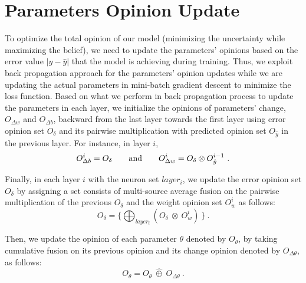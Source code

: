 {\color{red}
\section{Parameters Opinion Update}
\label{opt_app}
To optimize the total opinion of our model (minimizing the uncertainty while maximizing the belief), we need to update the parameters' opinions based on the error value $|y-\hat{y}|$ that the model is achieving during training. Thus, we exploit back propagation approach for the parameters' opinion updates while we are updating the actual parameters in mini-batch gradient descent to minimize the loss function. Based on what we perform in back propagation process to update the parameters in each layer, we initialize the opinions of parameters' change, $O_{\Delta w}$ and $O_{\Delta b}$, backward from the last layer towards the first layer using error opinion set $O_{\delta}$ and its pairwise multiplication with predicted opinion set $O_{\hat{y}}$ in the previous layer. For instance, in layer $i$,
\begin{equation}
    O_{\Delta b}^i = O_{\delta} \qquad \textnormal{and} \qquad O_{\Delta w}^i = O_{\delta} \otimes O_{\hat{y}}^{i-1}\ .
\end{equation}

Finally, in each layer $i$ with the neuron set $layer_i$, we update the error opinion set $O_{\delta}$ by assigning a set consists of multi-source average fusion on the pairwise multiplication of the previous $O_{\delta}$ and the weight opinion set $O_{w}^i$ as follows:
\begin{equation}
    O_{\delta} = \{ \bigoplus_{layer_i}(O_{\delta}\ \otimes\ O_{w}^i)\ \}\ .
\end{equation}

Then, we update the opinion of each parameter $\theta$ denoted by $O_{\theta}$, by taking cumulative fusion on its previous opinion and its change opinion denoted by $O_{\Delta \theta}$, as follows:
\begin{equation}
    O_{\theta} = O_{\theta}\ \widehat{\oplus}\ O_{\Delta \theta}\ .
\end{equation}
}

